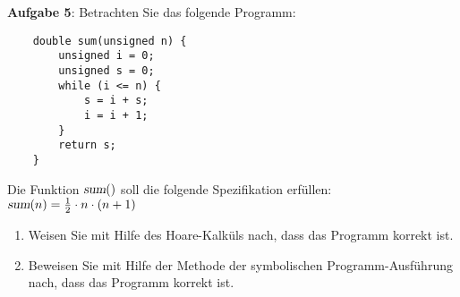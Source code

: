 \documentclass{article}
\begin{document}
\noindent
\textbf{Aufgabe 5}:  Betrachten Sie das folgende Programm:
\begin{verbatim}
    double sum(unsigned n) {
        unsigned i = 0;
        unsigned s = 0;
        while (i <= n) {
            s = i + s;
            i = i + 1;
        }
        return s;
    }
\end{verbatim}
Die Funktion $\textsl{sum}()$ soll die folgende Spezifikation erf\"ullen:
\\[0.2cm]
\hspace*{1.3cm} $\textsl{sum}(n) = \frac{1}{2} \cdot n \cdot (n + 1)$
\begin{enumerate}
\item Weisen Sie mit Hilfe des Hoare-Kalk\"uls nach, dass das Programm korrekt ist.
\item Beweisen Sie mit Hilfe der Methode der symbolischen Programm-Ausf\"uhrung nach,
      dass das Programm korrekt ist.
\end{enumerate}
\vspace{0.3cm}
\end{document}
